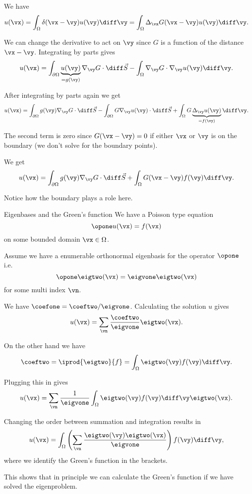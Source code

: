 \begin{frame}
	We have 
	\[ u(\vx) = \int_{\Omega} \delta(\vx-\vy) u(\vy) \diff \vy =  \int_{\Omega} \Delta_\vx G(\vx-\vy) u(\vy) \diff \vy. \]
	
	\pause
	We can change the derivative to act on $ \vy $ since $ G $ is a function of the distance $ \vx - \vy $. Integrating by parts gives
	\[ u(\vx) = \int_{\partial \Omega} \underbrace{u(\vy)}_{=g(\vy)} \nabla_{\vy} G \cdot \diff \vec{S} -  
	\int_{\Omega} \nabla_{\vy} G \cdot \nabla_{\vy}  u(\vy) \diff \vy.
	\]
	
	\pause
	After integrating by parts again we get 
	\[ u(\vx) = \int_{\partial \Omega} g(\vy) \nabla_{\vy} G \cdot \diff \vec{S}  
	- \int_{\partial \Omega}   G \nabla_{\vy} u(\vy) \cdot \diff \vec{S}
	+ \int_{\Omega}  G   \underbrace{\Delta_{\vy} u(\vy)}_{=f(\vy)} \diff \vy.
	\]
	
	\pause
	The second term is zero since $ G(\vx-\vy) = 0 $ if either $ \vx $ or $ \vy $ is on the boundary (we don't solve for the boundary points). 
\end{frame}

\begin{frame}
	We get 
	\[ u(\vx) = \int_{\partial \Omega} g(\vy) \nabla_{\vy} G \cdot \diff \vec{S}  
	+  \int_{\Omega}  G(\vx -\vy)   f(\vy) \diff \vy.
	\]
	
	Notice how the boundary plays a role here. 
\end{frame}

\begin{frame}{Eigenbases and the Green's function}
	We have a Poisson type equation 
	\[ \opone u(\vx) = f(\vx) \]
	on some bounded domain $ \vx \in \Omega $. 
	
	\pause
	Assume we have a enumerable orthonormal eigenbasis for the operator $ \opone $ i.e. 
	\[ \opone \eigtwo(\vx) = \eigvone \eigtwo(\vx) \]
	for some multi index $ \vn $.
	
	\pause
	We have 
	$ \coefone = \coeftwo/\eigvone $. Calculating the solution $ u $ gives
	\[ u(\vx) = \sum_{\vn} \frac{\coeftwo}{\eigvone} \eigtwo (\vx). \]
	
	\pause
	On the other hand we have 
	\[ \coeftwo = \iprod{\eigtwo}{f} = \int_{\Omega} \eigtwo(\vy) f(\vy) \diff \vy. \]

\end{frame}

\begin{frame}
	Plugging this in gives
	\[ u(\vx) = \sum_{\vn} \frac{1}{\eigvone} \int_{\Omega} \eigtwo(\vy) f(\vy) \diff \vy \eigtwo (\vx). \]
	
	\pause
	Changing the order between summation and integration results in 
	\[ u(\vx) = \int_{\Omega} \left( \sum_{\vn} \frac{\eigtwo(\vy) \eigtwo (\vx) }{\eigvone} \right)  f(\vy) \diff \vy,  \]
	where we identify the Green's function in the brackets. 
	
	\pause
	This shows that in principle we can calculate the Green's function if we have solved the eigenproblem. 
\end{frame}


